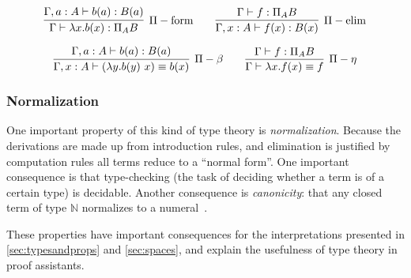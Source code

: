 \begin{equation*}
\infer[\Pi-\operatorname{form}]
  {\Gamma \vdash \lambda x.b(x) : \Pi_A B}
  {\Gamma, a:A \vdash b(a) : B(a)}
\qquad
\infer[\Pi-\operatorname{elim}]
  {\Gamma, x:A \vdash f(x) : B(x)}
  {\Gamma \vdash f : \Pi_A B}
\end{equation*}

\begin{equation*}
\infer[\Pi-\beta]
  {\Gamma, x:A \vdash (\lambda y.b(y)~x) \equiv b(x)}
  {\Gamma, a:A \vdash b(a) : B(a)}
\qquad
\infer[\Pi-\eta]
  {\Gamma \vdash \lambda x.f(x) \equiv f}
  {\Gamma \vdash f : \Pi_A B}
\end{equation*}

\subsubsection{Normalization}
One important property of this kind of type theory is
\emph{normalization}. Because the derivations are made up from introduction
rules, and elimination is justified by computation rules all terms reduce to a
``normal form''. One important consequence is that type-checking (the task of
deciding whether a term is of a certain type) is decidable. Another consequence
is \emph{canonicity}: that any closed term of type $\mathbb{N}$ normalizes to a
numeral~\cite{hottbook}.

These properties have important consequences for the interpretations presented
in \autoref{sec:typesandprops} and \autoref{sec:spaces}, and explain the
usefulness of type theory in proof assistants.